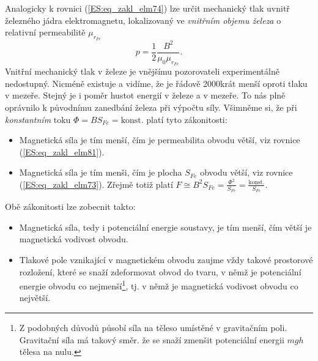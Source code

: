       Analogicky k rovnici (\ref{ES:eq_zakl_elm74}) lze určit mechanický tlak uvnitř železného 
      jádra elektromagnetu, lokalizovaný ve \emph{vnitřním objemu železa} o relativní permeabilitě 
      \(\mu_{r_{Fe}}\)
      \begin{equation}\label{ES:eq_zakl_elm81}
       p = \frac{1}{2}\frac{B^2}{\mu_0\mu_{r_{Fe}}}.
      \end{equation}
      Vnitřní mechanický tlak v železe je vnějšímu pozorovateli experimentálně nedostupný. Nicméně 
      existuje a vidíme, že je řádově 2000krát menší oproti tlaku v mezeře. Stejný je i poměr 
      hustot energií v železe a v mezeře. To nás plně oprávnilo k původnímu zanedbání železa při 
      výpočtu síly. Všimněme si, že při \emph{konstantním} toku \(\Phi = BS_{Fe} = \text{konst}\). 
      platí tyto zákonitosti:
      \begin{itemize}[noitemsep]
        \item Magnetická síla je tím menší, čím je permeabilita obvodu větší, viz rovnice     
              (\ref{ES:eq_zakl_elm81}).
        \item Magnetická síla je tím menši, čím je plocha \(S_{Fe}\) obvodu větší, viz rovnice 
              (\ref{ES:eq_zakl_elm73}). Zřejmě totiž platí \(F \cong B^2S_{Fe} = 
              \frac{\Phi^2}{S_{Fe}} = \frac{\text{konst.}}{S_{Fe}}\).
      \end{itemize}
      Obě zákonitosti lze zobecnit takto:
      \begin{itemize}[noitemsep]
        \item Magnetická síla, tedy i potenciální energie soustavy, je tím menší, čím větší je    
              magnetická vodivost obvodu.
        \item Tlakové pole vznikající v magnetickém obvodu zaujme vždy takové prostorové rozložení, 
              které se snaží zdeformovat obvod do tvaru, v němž je potenciální energie obvodu co 
              nejmenší\footnote{Z podobných důvodů působí síla na těleso umístěné v gravitačním 
              poli. Gravitační síla má takový směr. že se snaží zmenšit potenciální energii \(mgh\) 
              tělesa na nulu.}, tj. v němž je magnetická vodivost obvodu co největší.
      \end{itemize}
      
